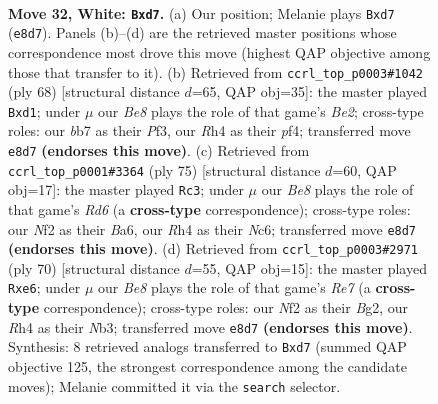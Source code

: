 \documentclass[11pt]{article}
\begin{document}
\clearpage

\begin{figure}[p]\centering
\begin{subfigure}{0.46\textwidth}\centering
\resizebox{\linewidth}{!}{%
\newchessgame
\chessboard[
  setfen={r3B3/1b1n2k1/1n6/3p4/p6R/P5P1/1PP2N2/2K5 w - - 7 32},
  showmover=false,
  pgfstyle=straightmove, color=movearrow, markmove={e8-d7}
]}
\caption{}
\end{subfigure}\hfill
\begin{subfigure}{0.46\textwidth}\centering
\resizebox{\linewidth}{!}{%
\newchessgame
\chessboard[
  setfen={8/6k1/R2p4/3P2p1/4Pp2/5P1n/1r2B2P/3nK3 w - - 0 35},
  showmover=false,
  pgfstyle=straightmove, color=movearrow, markmove={e2-d1}
]}
\caption{}
\end{subfigure}
\\[4pt]
\begin{subfigure}{0.46\textwidth}\centering
\resizebox{\linewidth}{!}{%
\newchessgame
\chessboard[
  setfen={5k2/5pp1/b1n1p2p/P7/6P1/1N1r4/5PP1/R2B2K1 b - - 8 38},
  showmover=false,
  pgfstyle=straightmove, color=movearrow, markmove={d3-c3}
]}
\caption{}
\end{subfigure}\hfill
\begin{subfigure}{0.46\textwidth}\centering
\resizebox{\linewidth}{!}{%
\newchessgame
\chessboard[
  setfen={1kb5/4R3/p2nr3/1p1p4/1P6/PN6/2P3B1/1K6 w - - 3 36},
  showmover=false,
  pgfstyle=straightmove, color=movearrow, markmove={e7-e6}
]}
\caption{}
\end{subfigure}
\caption{\textbf{Move 32, White: \texttt{Bxd7}.} (a) Our position; Melanie plays \texttt{Bxd7} (\texttt{e8d7}). Panels (b)--(d) are the retrieved master positions whose correspondence most drove this move (highest QAP objective among those that transfer to it). (b) Retrieved from \texttt{ccrl\_top\_p0003\#1042} (ply 68) [structural distance $d$=65, QAP obj=35]: the master played \texttt{Bxd1}; under $\mu$ our \emph{Be8} plays the role of that game's \emph{Be2}; cross-type roles: our \emph{b}b7 as their \emph{P}f3, our \emph{R}h4 as their \emph{p}f4; transferred move \texttt{e8d7} \textbf{(endorses this move)}. (c) Retrieved from \texttt{ccrl\_top\_p0001\#3364} (ply 75) [structural distance $d$=60, QAP obj=17]: the master played \texttt{Rc3}; under $\mu$ our \emph{Be8} plays the role of that game's \emph{Rd6} (a \textbf{cross-type} correspondence); cross-type roles: our \emph{N}f2 as their \emph{B}a6, our \emph{R}h4 as their \emph{N}c6; transferred move \texttt{e8d7} \textbf{(endorses this move)}. (d) Retrieved from \texttt{ccrl\_top\_p0003\#2971} (ply 70) [structural distance $d$=55, QAP obj=15]: the master played \texttt{Rxe6}; under $\mu$ our \emph{Be8} plays the role of that game's \emph{Re7} (a \textbf{cross-type} correspondence); cross-type roles: our \emph{N}f2 as their \emph{B}g2, our \emph{R}h4 as their \emph{N}b3; transferred move \texttt{e8d7} \textbf{(endorses this move)}. Synthesis: 8 retrieved analogs transferred to \texttt{Bxd7} (summed QAP objective 125, the strongest correspondence among the candidate moves); Melanie committed it via the \texttt{search} selector.}
\label{fig:thought-m62}
\end{figure}
\end{document}
